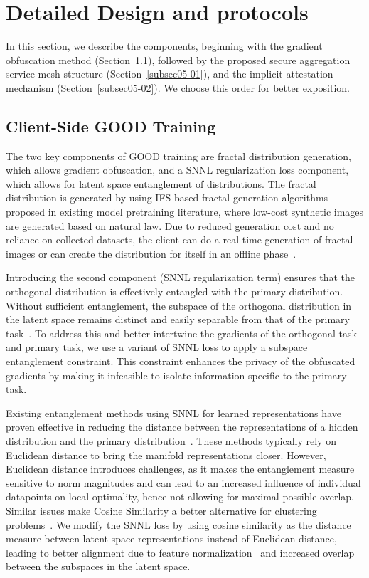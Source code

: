 \section{Detailed Design and protocols}
\label{sec05}
In this section, we describe the \sysname components, beginning with the gradient obfuscation method (Section~\ref{subsec05-03}), followed by the proposed secure aggregation service mesh structure (Section~\ref{subsec05-01}), and the implicit attestation mechanism (Section~\ref{subsec05-02}). 
We choose this order for better exposition. 
\subsection{Client-Side GOOD Training} 
\label{subsec05-03}
The two key components of GOOD training are fractal distribution generation, which allows gradient obfuscation, and a SNNL regularization loss component, which allows for latent space entanglement of distributions. The fractal distribution is generated by using IFS-based fractal generation algorithms proposed in existing model pretraining literature, where low-cost synthetic images are generated based on natural law. Due to reduced generation cost and no reliance on collected datasets, the client can do a real-time generation of fractal images or can create the distribution for itself in an offline phase~\cite{KatOkaKaz20,AndFar22}.


Introducing the second component (SNNL regularization term) ensures that the orthogonal distribution is effectively entangled with the primary distribution. Without sufficient entanglement, the subspace of the orthogonal distribution in the latent space remains distinct and easily separable from that of the primary task~\cite{JiaChoCha21}. To address this and better intertwine the gradients of the orthogonal task and primary task, we use a variant of SNNL loss to apply a subspace entanglement constraint. This constraint enhances the privacy of the obfuscated gradients by making it infeasible to isolate information specific to the primary task.

Existing entanglement methods using SNNL for learned representations have proven effective in reducing the distance between the representations of a hidden distribution and the primary distribution~\cite{JiaChoCha21}. These methods typically rely on Euclidean distance to bring the manifold representations closer. However, Euclidean distance introduces challenges, as it makes the entanglement measure sensitive to norm magnitudes and can lead to an increased influence of individual datapoints on local optimality, hence not allowing for maximal possible overlap. Similar issues make Cosine Similarity a better alternative for clustering problems~\cite{Hua08}. We modify the SNNL loss by using cosine similarity as the distance measure between latent space representations instead of Euclidean distance, leading to better alignment due to feature normalization~\cite{ChuJiaLei17} and increased overlap between the subspaces in the latent space.


